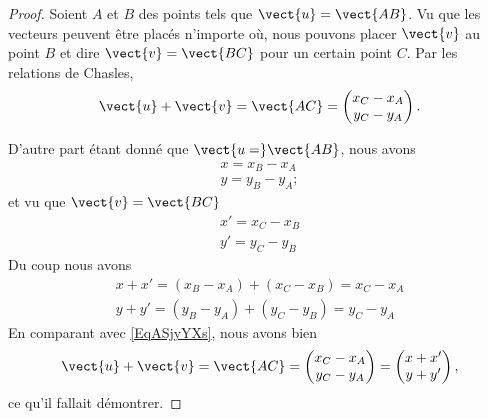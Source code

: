 \begin{proof}
    Soient \( A\) et \( B\) des points tels que \( \vect{ u }=\vect{ AB }\). Vu que les vecteurs peuvent être placés n'importe où, nous pouvons placer \( \vect{ v }\) au point \( B\) et dire \( \vect{ v }=\vect{ BC }\) pour un certain point \( C\). Par les relations de Chasles,
    \begin{equation}    \label{EqASjyYXs}
        \vect{ u }+\vect{ v }=\vect{ AC }=\begin{pmatrix}
            x_C-x_A    \\ 
            y_C-y_A    
        \end{pmatrix}.
    \end{equation}
    
    D'autre part étant donné que \( \vect{ u= }\vect{ AB }\), nous avons
    \begin{subequations}
        \begin{align}
            x=x_B-x_A\\
            y=y_B-y_A;
        \end{align}
    \end{subequations}
    et vu que \( \vect{ v }=\vect{ BC }\)
    \begin{subequations}
        \begin{align}
            x'=x_C-x_B\\
            y'=y_C-y_B
        \end{align}
    \end{subequations}
    Du coup nous avons
    \begin{subequations}
        \begin{align}
            x+x'=(x_B-x_A)+(x_C-x_B)=x_C-x_A\\
            y+y'=(y_B-y_A)+(y_C-y_B)=y_C-y_A
        \end{align}
    \end{subequations}
    En comparant avec \eqref{EqASjyYXs}, nous avons bien
    \begin{equation}
        \vect{ u }+\vect{ v }=\vect{ AC }=\begin{pmatrix}
            x_C-x_A    \\ 
            y_C-y_A    
        \end{pmatrix}=\begin{pmatrix}
            x+x'    \\ 
            y+y'    
        \end{pmatrix},
    \end{equation}
    ce qu'il fallait démontrer.
\end{proof}
